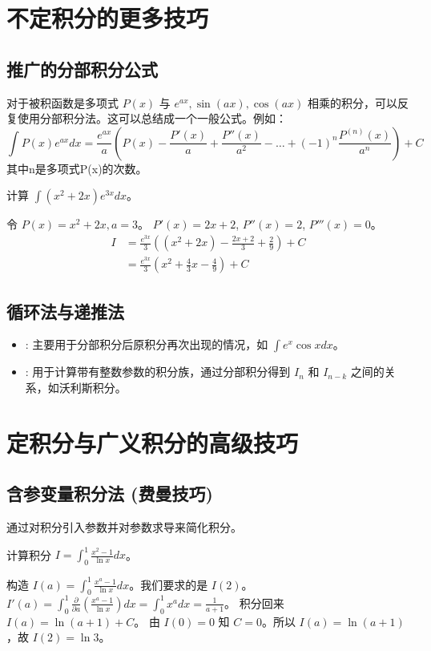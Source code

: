 \documentclass[lang=cn,newtx,10pt,scheme=chinese]{elegantbook}
\renewcommand{\textbf}[1]{\text{\heiti #1}}
\begin{document}
\begin{solution}
\chapter{不定积分的更多技巧}

\section{推广的分部积分公式}
对于被积函数是多项式 $P(x)$ 与 $e^{ax}, \sin(ax), \cos(ax)$ 相乘的积分，可以反复使用分部积分法。这可以总结成一个一般公式。例如：
\begin{equation}
\int P(x)e^{ax}dx=\frac{e^{ax}}{a}\left(P(x) - \frac{P'(x)}{a} + \frac{P''(x)}{a^2} - \dots + (-1)^n \frac{P^{(n)}(x)}{a^n}\right) + C
\end{equation}
其中n是多项式P(x)的次数。
\begin{problem}
计算 $\int (x^2+2x)e^{3x} dx$。
\end{problem}
\begin{solution}
令 $P(x)=x^2+2x, a=3$。
$P'(x) = 2x+2$, $P''(x) = 2$, $P'''(x)=0$。
\begin{align*}
    I &= \frac{e^{3x}}{3} \left( (x^2+2x) - \frac{2x+2}{3} + \frac{2}{9} \right) + C \\
      &= \frac{e^{3x}}{3} \left( x^2 + \frac{4}{3}x - \frac{4}{9} \right) + C
\end{align*}
\end{solution}

\section{循环法与递推法}
\begin{itemize}
    \item \textbf{循环法}: 主要用于分部积分后原积分再次出现的情况，如 $\int e^x \cos x dx$。
    \item \textbf{递推法}: 用于计算带有整数参数的积分族，通过分部积分得到 $I_n$ 和 $I_{n-k}$ 之间的关系，如沃利斯积分。
\end{itemize}

\chapter{定积分与广义积分的高级技巧}

\section{含参变量积分法 (费曼技巧)}
通过对积分引入参数并对参数求导来简化积分。
\begin{problem}
    计算积分 $I = \int_0^1 \frac{x^2 - 1}{\ln x} dx$。
\end{problem}
\begin{solution}
    构造 $I(a) = \int_0^1 \frac{x^a - 1}{\ln x} dx$。我们要求的是 $I(2)$。
    $I'(a) = \int_0^1 \frac{\partial}{\partial a} (\frac{x^a - 1}{\ln x}) dx = \int_0^1 x^a dx = \frac{1}{a+1}$。
    积分回来 $I(a) = \ln(a+1) + C$。
    由 $I(0) = 0$ 知 $C=0$。所以 $I(a)=\ln(a+1)$，故 $I(2)=\ln 3$。
\end{solution}


\end{solution}
\end{document}
